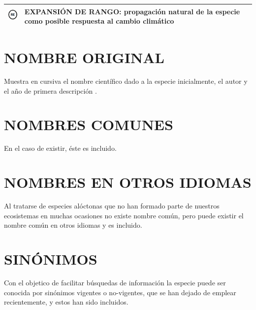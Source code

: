 \documentclass{article}
\begin{document}
\begin{table}[H]
\begin{center}
\begin{tabular}{ >{\centering\arraybackslash}m{2cm} >{\arraybackslash}m{12cm}}
\centering\includegraphics[width=1cm, height=1cm]{./images/RE.png} &\textbf{EXPANSIÓN DE RANGO:} propagación natural de la especie como posible respuesta al cambio climático \cite{15,16}\\
\hline
\end{tabular}
\end{center}
\caption{}
\label{table4}
\end{table}

\section*{\normalsize{NOMBRE ORIGINAL}}
 Muestra en cursiva el nombre científico dado a la especie inicialmente, el autor y el  año de  primera descripción \cite{13,14}.

\section*{NOMBRES COMUNES}
En el caso de existir, éste es incluido.

\section*{NOMBRES EN OTROS IDIOMAS}
Al tratarse de especies alóctonas que no han formado parte de nuestros ecosistemas en muchas ocasiones no existe nombre común, pero puede existir el nombre común en otros idiomas y es incluido.

\section*{SINÓNIMOS}
Con el objetico de facilitar búsquedas de información la especie  puede ser conocida por sinónimos vigentes o no-vigentes, que se han dejado de emplear recientemente, y estos han sido incluidos.
\end{document}

